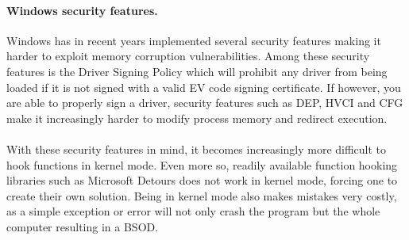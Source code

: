 \documentclass{report}
\begin{document}
\paragraph{Windows security features.} Windows has in recent years implemented several security features making it harder to exploit memory corruption vulnerabilities. Among these security features is the Driver Signing Policy which will prohibit any driver from being loaded if it is not signed with a valid EV code signing certificate\cite{url:hooking-driver-signing-policy}.
If however, you are able to properly sign a driver, security features such as \gls{DEP}, \gls{HVCI} and \gls{CFG} make it increasingly harder to modify process memory and redirect execution.
\\
\\
With these security features in mind, it becomes increasingly more difficult to hook functions in kernel mode. Even more so, readily available function hooking libraries such as Microsoft Detours\cite{url:hooking:detours} does not work in kernel mode, forcing one to create their own solution. Being in kernel mode also makes mistakes very costly, as a simple exception or error will not only crash the program but the whole computer resulting in a \gls{BSOD}.
\end{document}
